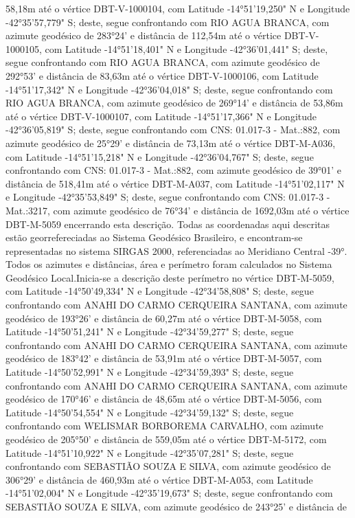 58,18m  até o vértice DBT-V-1000104, com Latitude -14°51'19,250" N e Longitude -42°35'57,779" S; deste, segue confrontando com RIO AGUA BRANCA, com azimute geodésico de 283°24' e distância de 
112,54m  até o vértice DBT-V-1000105, com Latitude -14°51'18,401" N e Longitude -42°36'01,441" S; deste, segue confrontando com RIO AGUA BRANCA, com azimute geodésico de 292°53' e distância de 
83,63m  até o vértice DBT-V-1000106, com Latitude -14°51'17,342" N e Longitude -42°36'04,018" S; deste, segue confrontando com RIO AGUA BRANCA, com azimute geodésico de 269°14' e distância de 
53,86m  até o vértice DBT-V-1000107, com Latitude -14°51'17,366" N e Longitude -42°36'05,819" S; deste, segue confrontando com CNS: 01.017-3 - Mat.:882, com azimute geodésico de 25°29' e distância de 
73,13m  até o vértice DBT-M-A036, com Latitude -14°51'15,218" N e Longitude -42°36'04,767" S; deste, segue confrontando com CNS: 01.017-3 - Mat.:882, com azimute geodésico de 39°01' e distância de 
518,41m  até o vértice DBT-M-A037, com Latitude -14°51'02,117" N e Longitude -42°35'53,849" S; deste, segue confrontando com CNS: 01.017-3 - Mat.:3217, com azimute geodésico de 76°34' e distância de 
1692,03m  até o vértice DBT-M-5059 encerrando esta descrição. Todas as coordenadas aqui descritas estão georrefereciadas ao Sistema Geodésico Brasileiro, e encontram-se representadas no sistema SIRGAS 2000, referenciadas ao Meridiano Central -39°. Todos os azimutes e distâncias, área e perímetro foram calculados no Sistema Geodésico Local.Inicia-se a descrição deste perímetro no vértice DBT-M-5059, com Latitude -14°50'49,334" N e Longitude -42°34'58,808" S; deste, segue confrontando com ANAHI DO CARMO CERQUEIRA SANTANA, com azimute geodésico de 193°26' e distância de 60,27m até o vértice DBT-M-5058, com Latitude -14°50'51,241" N e Longitude -42°34'59,277" S; deste, segue confrontando com ANAHI DO CARMO CERQUEIRA SANTANA, com azimute geodésico de 183°42' e distância de 
53,91m  até o vértice DBT-M-5057, com Latitude -14°50'52,991" N e Longitude -42°34'59,393" S; deste, segue confrontando com ANAHI DO CARMO CERQUEIRA SANTANA, com azimute geodésico de 170°46' e distância de 
48,65m  até o vértice DBT-M-5056, com Latitude -14°50'54,554" N e Longitude -42°34'59,132" S; deste, segue confrontando com WELISMAR BORBOREMA CARVALHO, com azimute geodésico de 205°50' e distância de 
559,05m  até o vértice DBT-M-5172, com Latitude -14°51'10,922" N e Longitude -42°35'07,281" S; deste, segue confrontando com SEBASTIÃO SOUZA E SILVA, com azimute geodésico de 306°29' e distância de 
460,93m  até o vértice DBT-M-A053, com Latitude -14°51'02,004" N e Longitude -42°35'19,673" S; deste, segue confrontando com SEBASTIÃO SOUZA E SILVA, com azimute geodésico de 243°25' e distância de 
